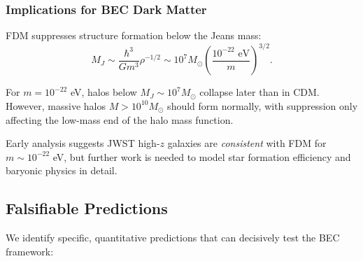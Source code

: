 \documentclass[11pt,a4paper]{article}
\newcommand{\Msun}{\ensuremath{M_\odot}}
\theoremstyle{definition}
\theoremstyle{remark}
\begin{document}
\subsubsection{Implications for BEC Dark Matter}

FDM suppresses structure formation below the Jeans mass:
\begin{equation}
M_J \sim \frac{\hbar^3}{G m^3} \rho^{-1/2} \sim 10^7 \Msun \left(\frac{10^{-22} \text{ eV}}{m}\right)^{3/2}.
\end{equation}

For $m = 10^{-22}$ eV, halos below $M_J \sim 10^7 \Msun$ collapse later than in CDM. However, massive halos $M > 10^{10} \Msun$ should form normally, with suppression only affecting the low-mass end of the halo mass function.

Early analysis suggests JWST high-$z$ galaxies are \emph{consistent} with FDM for $m \sim 10^{-22}$ eV, but further work is needed to model star formation efficiency and baryonic physics in detail.

\subsection{Falsifiable Predictions}
\label{sec:falsifiable}

We identify specific, quantitative predictions that can decisively test the BEC framework:
\end{document}
